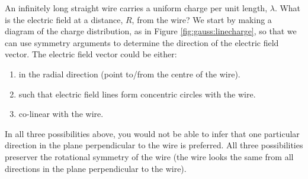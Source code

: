 \begin{example}{An infinitely long straight wire carries a uniform charge per unit length, $\lambda$. What is the electric field at a distance, $R$, from the wire?}
We start by making a diagram of the charge distribution, as in Figure \ref{fig:gauss:linecharge}, so that we can use symmetry arguments to determine the direction of the electric field vector. The electric field vector could be either:
\begin{enumerate}
\item in the radial direction (point to/from the centre of the wire).
\item such that electric field lines form concentric circles with the wire.
\item co-linear with the wire.
\end{enumerate}
In all three possibilities above, you would not be able to infer that one particular direction in the plane perpendicular to the wire is preferred. All three possibilities preserver the rotational symmetry of the wire (the wire looks the same from all directions in the plane perpendicular to the wire). 


\end{example}
